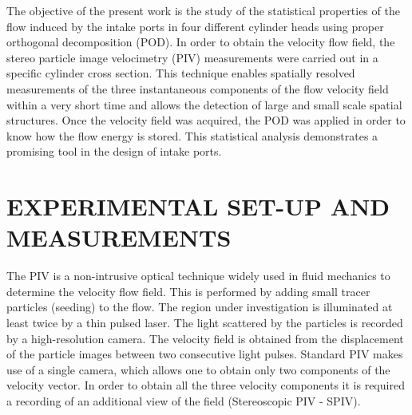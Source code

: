 \documentclass[10pt,fleqn,a4paper]{article}
\begin{document}
The objective of the present work is the study of the statistical properties of the flow induced by the intake ports in four different cylinder heads using proper orthogonal decomposition (POD). In order to obtain the velocity flow field, the stereo particle image velocimetry (PIV) measurements were carried out in a specific cylinder cross section. This technique enables spatially resolved measurements of the three instantaneous components of the flow velocity field within a very short time and allows the detection of large and small scale spatial structures. Once the velocity field was acquired, the POD was applied in order to know how the flow energy is stored. This statistical analysis demonstrates a promising tool in the design of intake ports.  


\section{EXPERIMENTAL SET-UP AND MEASUREMENTS}

The PIV is a non-intrusive optical technique widely used in fluid mechanics to determine the velocity flow field. This is performed by adding small tracer particles (seeding) to the flow. The region under investigation is illuminated at least twice by a thin pulsed laser. The light scattered by the particles is recorded by a high-resolution camera. The velocity field is obtained from the displacement of the particle images between two consecutive light pulses. Standard PIV makes use of a single camera, which allows one to obtain only two components of the velocity vector. In order to obtain all the three velocity components it is required a recording of an additional view of the field (Stereoscopic PIV - SPIV).
\end{document}
